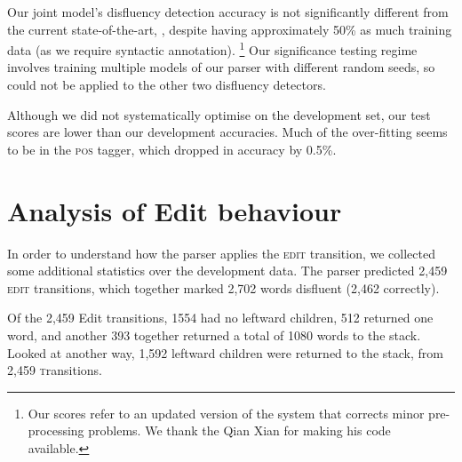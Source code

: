 \documentclass[11pt,letterpaper]{article}
\newcommand{\edittrans}{\textsc{edit}\xspace}
\begin{document}
Our joint model's disfluency detection accuracy is not significantly different from
the current state-of-the-art, \citet{qian:13}, despite having approximately 50\%
as much training data (as we require syntactic annotation).
\footnote{Our scores refer to an updated version of the system
that corrects minor pre-processing problems. We thank the Qian Xian for making
his code available.}
Our significance testing regime involves training multiple
models of our parser with different random seeds, so could not be applied to
the other two disfluency detectors.

Although we did not systematically
optimise on the development set, our test scores are lower than our development
accuracies. Much of the over-fitting seems to be in the \textsc{pos} tagger,
which dropped in accuracy by 0.5\%.

\section{Analysis of Edit behaviour}

In order to understand how the parser applies the \edittrans transition, we
collected some additional statistics over the development data.
The parser predicted 2,459 \edittrans transitions,
which together marked 2,702
words disfluent (2,462 correctly).

Of the 2,459 Edit transitions, 1554 had no leftward children, 512 returned one word,
and another 393 together returned a total of 1080 words to the stack. Looked at
another way, 1,592 leftward children were returned to the stack, from
2,459 \textsc transitions.
\end{document}
